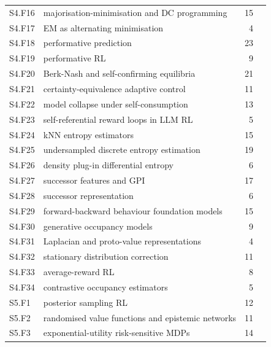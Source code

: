 \documentclass[10pt]{article}
\begin{document}
{\begin{longtable}{@{}p{1.3cm}p{8.6cm}rp{4.4cm}@{}}
S4.F16 & majorisation-minimisation and DC programming & 15 & \citet{LeThi-dc18}\\
S4.F17 & EM as alternating minimisation & 4 & \citet{Csiszar-idivergence75}\\
S4.F18 & performative prediction & 23 & \citet{Perdomo-performative20}\\
S4.F19 & performative RL & 9 & \citet{Mandal-performative23}\\
S4.F20 & Berk-Nash and self-confirming equilibria & 21 & \citet{Esponda-equilibrium21}\\
S4.F21 & certainty-equivalence adaptive control & 11 & \citet{BarShalom-dual74}\\
S4.F22 & model collapse under self-consumption & 13 & \citet{Shumailov-curse23}\\
S4.F23 & self-referential reward loops in LLM RL & 5 & \citet{Pan-feedback24}\\
S4.F24 & kNN entropy estimators & 15 & \citet{Kozachenko-sample87}\\
S4.F25 & undersampled discrete entropy estimation & 19 & \citet{Paninski-estimation03}\\
S4.F26 & density plug-in differential entropy & 6 & \citet{Ahmad-nonparametric76}\\
S4.F27 & successor features and GPI & 17 & \citet{Barreto-successor17}\\
S4.F28 & successor representation & 6 & \citet{Dayan-improving93}\\
S4.F29 & forward-backward behaviour foundation models & 15 & \citet{Touati-learning21}\\
S4.F30 & generative occupancy models & 9 & \citet{Janner-generative20}\\
S4.F31 & Laplacian and proto-value representations & 4 & \citet{Mahadevan-protovalue07}\\
S4.F32 & stationary distribution correction & 11 & \citet{Hallak-consistent17}\\
S4.F33 & average-reward RL & 8 & \citet{Schwartz-reinforcement93}\\
S4.F34 & contrastive occupancy estimators & 5 & \citet{Eysenbach-clearning21}\\
S5.F1 & posterior sampling RL & 12 & \citet{Osband-more13}\\
S5.F2 & randomised value functions and epistemic networks & 11 & \citet{Osband-deep17}\\
S5.F3 & exponential-utility risk-sensitive MDPs & 14 & \citet{Howard-risksensitive72}\\

\end{longtable}}
\end{document}
